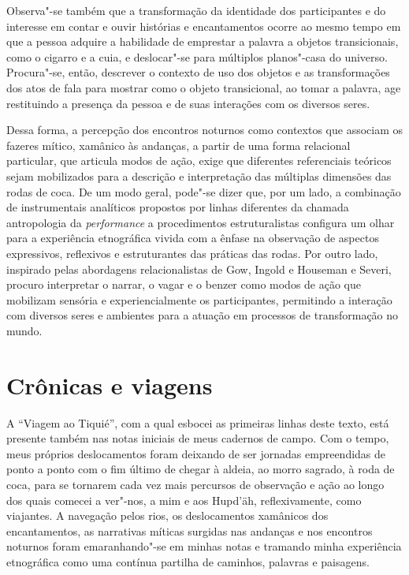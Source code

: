 Observa"-se também que a transformação da identidade dos participantes e
do interesse em contar e ouvir histórias e encantamentos ocorre ao mesmo
tempo em que a pessoa adquire a habilidade de emprestar a palavra a
objetos transicionais, como o cigarro e a cuia, e deslocar"-se para
múltiplos planos"-casa do universo. Procura"-se, então, descrever o
contexto de uso dos objetos e as transformações dos atos de fala para
mostrar como o objeto transicional, ao tomar a palavra, age restituindo
a presença da pessoa e de suas interações com os diversos seres.

Dessa forma, a percepção dos encontros noturnos como contextos que
associam os fazeres mítico, xamânico às andanças, a partir de uma forma
relacional particular, que articula modos de ação, exige que diferentes
referenciais teóricos sejam mobilizados para a descrição e interpretação
das múltiplas dimensões das rodas de coca. De um modo geral, pode"-se
dizer que, por um lado, a combinação de instrumentais analíticos
propostos por linhas diferentes da chamada antropologia da
\emph{performance} a procedimentos estruturalistas configura um olhar
para a experiência etnográfica vivida com a ênfase na observação de
aspectos expressivos, reflexivos e estruturantes das práticas das rodas.
Por outro lado, inspirado pelas abordagens relacionalistas de Gow,
Ingold e Houseman e Severi, procuro interpretar o narrar, o vagar e o
benzer como modos de ação que mobilizam sensória e experiencialmente os
participantes, permitindo a interação com diversos seres e ambientes
para a atuação em processos de transformação no mundo.

\section{Crônicas e viagens}\label{cruxf4nicas-e-viagens}

A ``Viagem ao Tiquié'', com a qual esbocei as primeiras linhas deste
texto, está presente também nas notas iniciais de meus cadernos de
campo. Com o tempo, meus próprios deslocamentos foram deixando de ser
jornadas empreendidas de ponto a ponto com o fim último de chegar à
aldeia, ao morro sagrado, à roda de coca, para se tornarem cada vez mais
percursos de observação e ação ao longo dos quais comecei a ver"-nos, a
mim e aos Hupd'äh, reflexivamente, como viajantes. A navegação pelos
rios, os deslocamentos xamânicos dos encantamentos, as narrativas
míticas surgidas nas andanças e nos encontros noturnos foram
emaranhando"-se em minhas notas e tramando minha experiência etnográfica
como uma contínua partilha de caminhos, palavras e paisagens.

